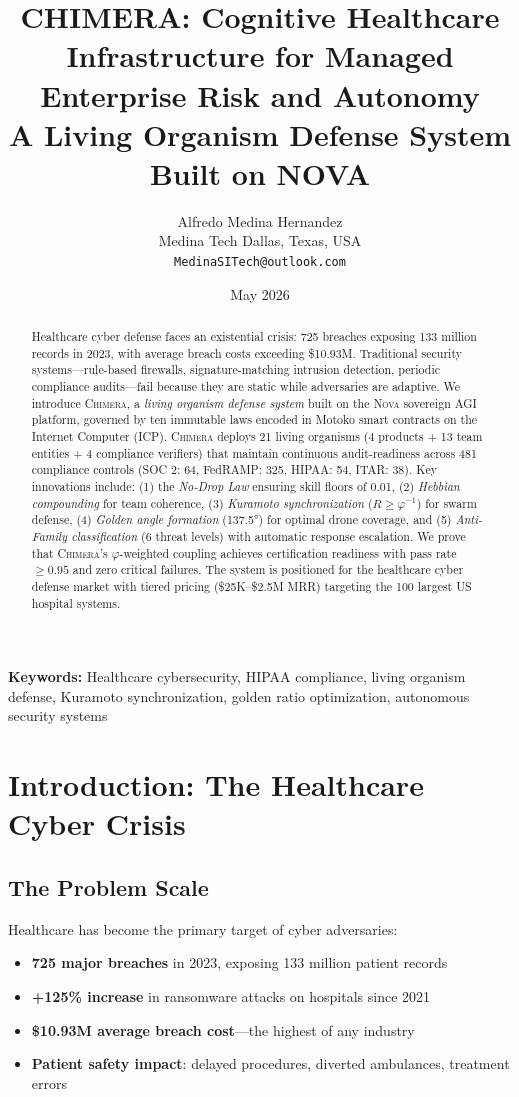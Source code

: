 \documentclass[12pt]{article}
\title{\textbf{CHIMERA: Cognitive Healthcare Infrastructure for Managed Enterprise Risk and Autonomy} \\
\large A Living Organism Defense System Built on NOVA}
\author{Alfredo Medina Hernandez \\
  \normalsize Medina Tech \quad Dallas, Texas, USA \\
  \normalsize \texttt{MedinaSITech@outlook.com}}
\date{May 2026}
\newcommand{\PHI}{\varphi}
\newcommand{\PHIINV}{\varphi^{-1}}
\newcommand{\CHIMERA}{\textsc{Chimera}}
\newcommand{\NOVA}{\textsc{Nova}}
\newcommand{\ICP}{\textsc{ICP}}
\begin{document}
\maketitle

\begin{abstract}
Healthcare cyber defense faces an existential crisis: 725 breaches exposing 133 million records in 2023, with average breach costs exceeding \$10.93M. Traditional security systems—rule-based firewalls, signature-matching intrusion detection, periodic compliance audits—fail because they are static while adversaries are adaptive. We introduce \CHIMERA{}, a \emph{living organism defense system} built on the \NOVA{} sovereign AGI platform, governed by ten immutable laws encoded in Motoko smart contracts on the Internet Computer (\ICP{}). \CHIMERA{} deploys 21 living organisms (4 products + 13 team entities + 4 compliance verifiers) that maintain continuous audit-readiness across 481 compliance controls (SOC 2: 64, FedRAMP: 325, HIPAA: 54, ITAR: 38). Key innovations include: (1) the \emph{No-Drop Law} ensuring skill floors of 0.01, (2) \emph{Hebbian compounding} for team coherence, (3) \emph{Kuramoto synchronization} ($R \geq \PHIINV$) for swarm defense, (4) \emph{Golden angle formation} (137.5°) for optimal drone coverage, and (5) \emph{Anti-Family classification} (6 threat levels) with automatic response escalation. We prove that \CHIMERA{}'s $\PHI$-weighted coupling achieves certification readiness with pass rate $\geq 0.95$ and zero critical failures. The system is positioned for the healthcare cyber defense market with tiered pricing (\$25K–\$2.5M MRR) targeting the 100 largest US hospital systems.
\end{abstract}

\textbf{Keywords:} Healthcare cybersecurity, HIPAA compliance, living organism defense, Kuramoto synchronization, golden ratio optimization, autonomous security systems

\section{Introduction: The Healthcare Cyber Crisis}
\label{sec:intro}

\subsection{The Problem Scale}

Healthcare has become the primary target of cyber adversaries:
\begin{itemize}[nosep]
  \item \textbf{725 major breaches} in 2023, exposing 133 million patient records~\cite{HHS2024}
  \item \textbf{+125\% increase} in ransomware attacks on hospitals since 2021~\cite{CISA2024}
  \item \textbf{\$10.93M average breach cost}—the highest of any industry~\cite{IBM2023}
  \item \textbf{Patient safety impact}: delayed procedures, diverted ambulances, treatment errors
\end{itemize}
\end{document}
